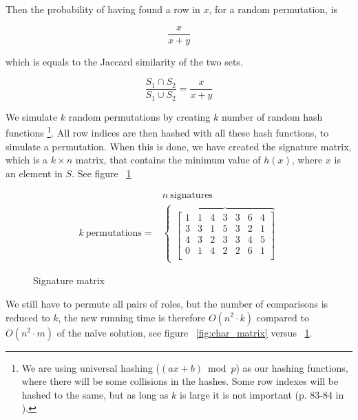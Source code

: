 \documentclass[a4paper,11pt]{article}
\begin{document}
Then the probability of having found a row in $x$, for a random permutation, is

\begin{equation*}
    \frac{x}{x+y}
\end{equation*}

which is equals to the Jaccard similarity of the two sets.

\begin{equation*}
    \frac{S_1 \cap S_2}{S_1 \cup S_2} = \frac{x}{x+y}
\end{equation*}
    
We simulate $k$ random permutations by creating $k$ number of random hash functions \footnote{We are using universal hashing ($(ax + b) \bmod p$) as our hashing functions, where there will be some collisions in the hashes. Some row indexes will be hashed to the same, but as long as $k$ is large it is not important (p. 83-84 in \cite{book:mmds}).}. All row indices are then hashed with all these hash functions, to simulate a permutation. When this is done, we have created the signature matrix, which is a $k\times n$ matrix, that contains the minimum value of $h(x)$, where $x$ is an element in $S$. See figure ~\ref{fig:signature_matrix}\\

\begin{figure}[!htpb]
    \begin{eqnarray*}
     & n \ \text{signatures} \\
     k \ \text{permutations} = & 
        \begin{cases}
        \overbrace{
        \begin{bmatrix}
            1 & 1 & 4 & 3 & 3 & 6 & 4\\
            3 & 3 & 1 & 5 & 3 & 2 & 1\\
            4 & 3 & 2 & 3 & 3 & 4 & 5\\
            0 & 1 & 4 & 2 & 2 & 6 & 1\\
        \end{bmatrix} 
        } 
        \end{cases}
    \end{eqnarray*}
    \caption{Signature matrix}
    \label{fig:signature_matrix}
\end{figure}

We still have to permute all pairs of roles, but the number of comparisons is reduced to $k$, the new running time is therefore $O(n^2 \cdot k)$ compared to $O(n^2 \cdot m)$ of the naïve solution, see figure ~\ref{fig:char_matrix} versus ~\ref{fig:signature_matrix}.
\end{document}
